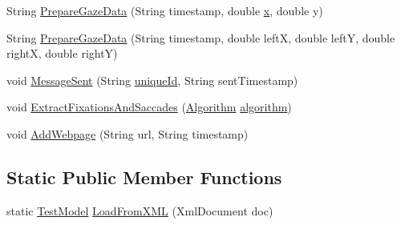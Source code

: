 \begin{DoxyCompactItemize}
\item 
String \hyperlink{class_web_analyzer_1_1_models_1_1_data_model_1_1_test_model_a21b653298654ea728c144a01e1dc79d0}{Prepare\+Gaze\+Data} (String timestamp, double \hyperlink{_u_i_2_h_t_m_l_resources_2js_2lib_2underscore_8min_8js_a81e910173af87b1161e719a504d52407}{x}, double y)
\item 
String \hyperlink{class_web_analyzer_1_1_models_1_1_data_model_1_1_test_model_a9a5e8a32d33cfbd93c7a42260d14e931}{Prepare\+Gaze\+Data} (String timestamp, double left\+X, double left\+Y, double right\+X, double right\+Y)
\item 
void \hyperlink{class_web_analyzer_1_1_models_1_1_data_model_1_1_test_model_af5443d18d5c7d80edaf417ee28bb296e}{Message\+Sent} (String \hyperlink{_u_i_2_h_t_m_l_resources_2js_2lib_2underscore_8min_8js_af690ff5521d79c7128861033ae80ae17}{unique\+Id}, String sent\+Timestamp)
\item 
void \hyperlink{class_web_analyzer_1_1_models_1_1_data_model_1_1_test_model_aca2998a693a880f8c1fd1457615988ac}{Extract\+Fixations\+And\+Saccades} (\hyperlink{class_web_analyzer_1_1_models_1_1_algorithm_model_1_1_algorithm}{Algorithm} \hyperlink{_u_i_2_h_t_m_l_resources_2js_2src_2analyse_8js_a1222cf9678e9ad6a699b071d3308f976}{algorithm})
\item 
void \hyperlink{class_web_analyzer_1_1_models_1_1_data_model_1_1_test_model_a71db82cab933dd7e7585915bd97740dd}{Add\+Webpage} (String url, String timestamp)
\end{DoxyCompactItemize}
\subsection*{Static Public Member Functions}
\begin{DoxyCompactItemize}
\item 
static \hyperlink{class_web_analyzer_1_1_models_1_1_data_model_1_1_test_model}{Test\+Model} \hyperlink{class_web_analyzer_1_1_models_1_1_data_model_1_1_test_model_a0bf31831033b33d1e50ddd856c6a61aa}{Load\+From\+X\+M\+L} (Xml\+Document doc)
\end{DoxyCompactItemize}
